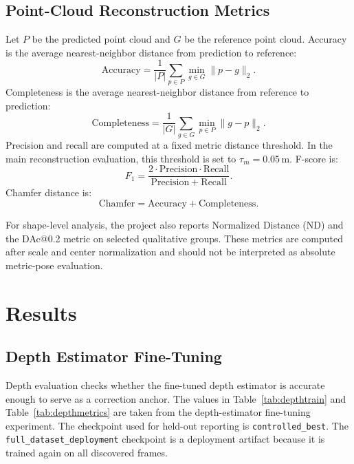 \documentclass[12pt,a4paper]{article}
\begin{document}
\subsection{Point-Cloud Reconstruction Metrics}
Let \(P\) be the predicted point cloud and \(G\) be the reference point cloud. Accuracy is the average nearest-neighbor distance from prediction to reference:
\begin{equation}
\mathrm{Accuracy}=\frac{1}{|P|}\sum_{p\in P}\min_{g\in G}\|p-g\|_2.
\end{equation}
Completeness is the average nearest-neighbor distance from reference to prediction:
\begin{equation}
\mathrm{Completeness}=\frac{1}{|G|}\sum_{g\in G}\min_{p\in P}\|g-p\|_2.
\end{equation}
Precision and recall are computed at a fixed metric distance threshold. In the main reconstruction evaluation, this threshold is set to \(\tau_m=0.05\,\mathrm{m}\). F-score is:
\begin{equation}
F_1=\frac{2\cdot \mathrm{Precision}\cdot \mathrm{Recall}}{\mathrm{Precision}+\mathrm{Recall}}.
\end{equation}
Chamfer distance is:
\begin{equation}
\mathrm{Chamfer}=\mathrm{Accuracy}+\mathrm{Completeness}.
\end{equation}

For shape-level analysis, the project also reports Normalized Distance (ND) and the DAc@0.2 metric on selected qualitative groups. These metrics are computed after scale and center normalization and should not be interpreted as absolute metric-pose evaluation.

\section{Results}
\subsection{Depth Estimator Fine-Tuning}
Depth evaluation checks whether the fine-tuned depth estimator is accurate enough to serve as a correction anchor. The values in Table~\ref{tab:depthtrain} and Table~\ref{tab:depthmetrics} are taken from the depth-estimator fine-tuning experiment. The checkpoint used for held-out reporting is \texttt{controlled\_best}. The \texttt{full\_dataset\_deployment} checkpoint is a deployment artifact because it is trained again on all discovered frames.
\end{document}
